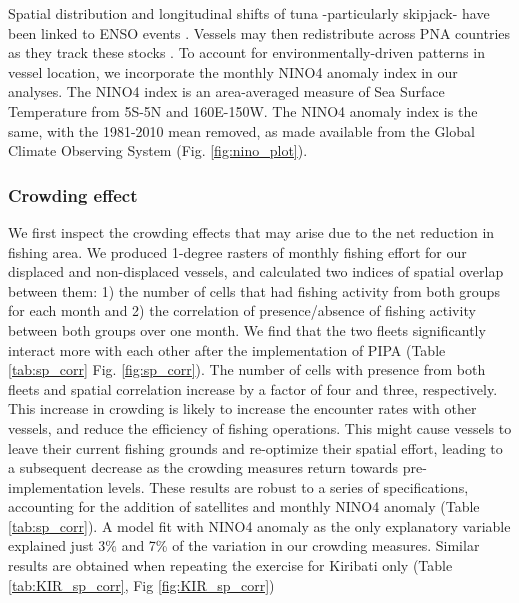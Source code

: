 \documentclass[9p,twocolumn,twoside,lineno]{pnas-new}
\begin{document}
Spatial distribution and longitudinal shifts of tuna -particularly skipjack- have been linked to ENSO events \cite{lehodey_1997}. Vessels may then redistribute across PNA countries as they track these stocks \cite{aqorau_2018}. To account for environmentally-driven patterns in vessel location, we incorporate the monthly NINO4 anomaly index in our analyses. The NINO4 index is an area-averaged measure of Sea Surface Temperature from 5S-5N and 160E-150W. The NINO4 anomaly index is the same, with the 1981-2010 mean removed, as made available from the Global Climate Observing System (Fig. \ref{fig:nino_plot}).

\subsubsection{Crowding effect}

We first inspect the crowding effects that may arise due to the net reduction in fishing area. We produced 1-degree rasters of monthly fishing effort for our displaced and non-displaced vessels, and calculated two indices of spatial overlap between them: 1) the number of cells that had fishing activity from both groups for each month and 2) the correlation of presence/absence of fishing activity between both groups over one month. We find that the two fleets significantly interact more with each other after the implementation of PIPA (Table \ref{tab:sp_corr} Fig. \ref{fig:sp_corr}). The number of cells with presence from both fleets and spatial correlation increase by a factor of four and three, respectively. This increase in crowding is likely to increase the encounter rates with other vessels, and reduce the efficiency of fishing operations. This might cause vessels to leave their current fishing grounds and re-optimize their spatial effort, leading to a subsequent decrease as the crowding measures return towards pre-implementation levels. These results are robust to a series of specifications, accounting for the addition of satellites and monthly NINO4 anomaly (Table \ref{tab:sp_corr}). A model fit with NINO4 anomaly as the only explanatory variable explained just 3\% and 7\% of the variation in our crowding measures. Similar results are obtained when repeating the exercise for Kiribati only (Table \ref{tab:KIR_sp_corr}, Fig \ref{fig:KIR_sp_corr})
\end{document}
